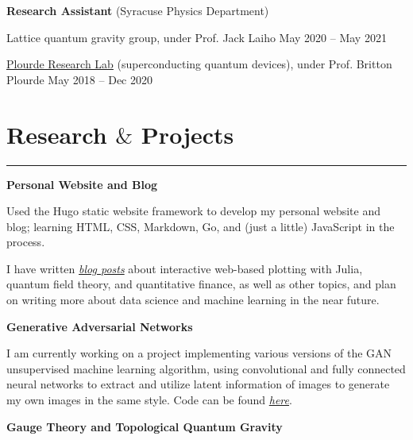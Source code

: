 \documentclass[9pt]{extarticle}
\newcommand{\myline}{\rule[\baselineskip]{\linewidth}{1pt}}
\begin{document}
\vspace{2.5pt}
\large\textbf{Research Assistant} \normalsize (Syracuse Physics Department)
\normalsize

\begin{compactitem}
\item Lattice quantum gravity group, under Prof. Jack Laiho \hfill \small May 2020 -- May 2021 
\normalsize
\item \href{https://bplourde.expressions.syr.edu/}{Plourde Research Lab} (superconducting quantum devices), under Prof. Britton Plourde \hfill \small May 2018 -- Dec 2020
\end{compactitem}




\section{Research $\&$ Projects}

\myline

\large\textbf{Personal Website and Blog}
\normalsize

\begin{compactitem}
\item Used the Hugo static website framework to develop my personal website and blog; learning HTML, CSS, Markdown, Go, and (just a little) JavaScript in the process. 
\item I have written \href{https://aarontrowbridge.github.io/posts/}{\textit{blog posts}} about interactive web-based plotting with Julia, quantum field theory, and quantitative finance, as well as other topics, and plan on writing more about data science and machine learning in the near future. 
\end{compactitem}

\vspace{2.5pt}
\large\textbf{Generative Adversarial Networks}
\normalsize

\begin{compactitem}
\item I am currently working on a project implementing various versions of the GAN unsupervised machine learning algorithm, using convolutional and fully connected neural networks to extract and utilize latent information of images to generate my own images in the same style. Code can be found \href{https://github.com/aarontrowbridge/FluxGAN.jl}{\textit{here}}.  
\end{compactitem}



\vspace{2.5pt}
\large\textbf{Gauge Theory and Topological Quantum Gravity}
\normalsize
\end{document}
